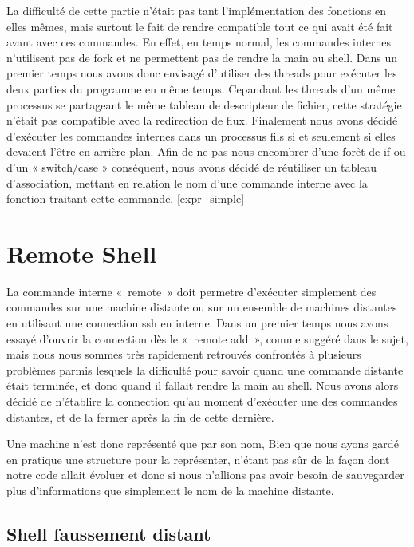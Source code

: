 \documentclass[12pt]{article}
\begin{document}
 La difficulté de cette partie n'était pas tant l'implémentation des fonctions en elles mêmes,
 mais surtout le fait de rendre compatible tout ce qui avait été fait avant avec ces commandes.
 En effet, en temps normal, les commandes internes n'utilisent pas de fork et ne permettent pas
 de rendre la main au shell. Dans un premier temps nous avons donc envisagé d'utiliser des threads
 pour exécuter les deux parties du programme en même temps. Cepandant les threads d'un même processus
 se partageant le même tableau de descripteur de fichier, cette stratégie n'était pas compatible
 avec la redirection de flux. Finalement nous avons décidé d'exécuter les commandes internes dans
 un processus fils si et seulement si elles devaient l'être en arrière plan.
 Afin de ne pas nous encombrer d'une forêt de if ou d'un « switch/case » conséquent, nous avons
 décidé de réutiliser un tableau d'association, mettant en relation le nom d'une commande interne
 avec la fonction traitant cette commande.  \ref{expr_simple}
 

\newpage
\section{Remote Shell}

La commande interne «~remote~» doit permetre d'exécuter simplement des commandes sur une machine
distante ou sur un ensemble de machines distantes en utilisant une connection ssh en interne. Dans un premier 
temps nous avons essayé d'ouvrir la connection dès le «~remote add~», comme suggéré dans le 
sujet, mais nous nous sommes très rapidement retrouvés confrontés à plusieurs problèmes parmis lesquels
la difficulté pour savoir quand une commande distante était terminée, et donc quand
il fallait rendre la main au shell. Nous avons alors décidé de n'établire la connection qu'au moment
d'exécuter une des commandes distantes, et de la fermer après la fin de cette dernière.\newline

Une machine n'est donc représenté que par son nom, Bien que nous ayons gardé en pratique une
structure pour la représenter, n'étant pas sûr de la façon dont notre code allait évoluer et
donc si nous n'allions pas avoir besoin de sauvegarder plus d'informations que simplement le
nom de la machine distante.


\subsection{Shell faussement distant}
\end{document}
